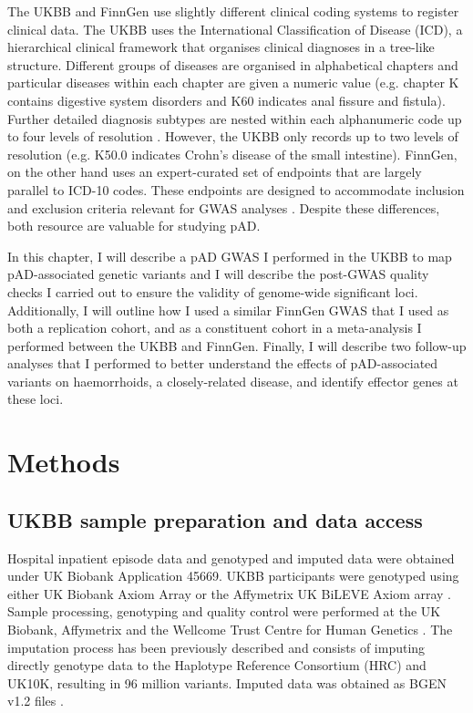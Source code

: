 The UKBB and FinnGen use slightly different clinical coding systems to register clinical data. The UKBB uses the International Classification of Disease (ICD), a hierarchical clinical framework that organises clinical diagnoses in a tree-like structure. Different groups of diseases are organised in alphabetical chapters and particular diseases within each chapter are given a numeric value (e.g. chapter K contains digestive system disorders and K60 indicates anal fissure and fistula). Further detailed diagnosis subtypes are nested within each alphanumeric code up to four levels of resolution \cite{icd10_levels}. However, the UKBB only records up to two levels of resolution (e.g. K50.0 indicates Crohn's disease of the small intestine). FinnGen, on the other hand uses an expert-curated set of endpoints that are largely parallel to ICD-10 codes. These endpoints are designed to accommodate inclusion and exclusion criteria relevant for GWAS analyses \cite{finngen_endpoints}. Despite these differences, both resource are valuable for studying pAD. 

In this chapter, I will describe a pAD GWAS I performed in the UKBB to map pAD-associated genetic variants and I will describe the post-GWAS quality checks I carried out to ensure the validity of genome-wide significant loci. Additionally, I will outline how I used a similar FinnGen GWAS that I used as both a replication cohort, and as a constituent cohort in a meta-analysis I performed between the UKBB and FinnGen. Finally, I will describe two follow-up analyses that I performed to better understand the effects of pAD-associated variants on haemorrhoids, a closely-related disease, and identify effector genes at these loci.

\section{Methods}
\subsection{UKBB sample preparation and data access}
Hospital inpatient episode data and genotyped and imputed data were obtained under UK Biobank Application 45669. UKBB participants were genotyped using either UK Biobank Axiom Array \cite{ukbbaxiom_array} or the Affymetrix UK
BiLEVE Axiom array \cite{ukbbbelieve_array}. Sample processing, genotyping and quality control were performed at the UK Biobank, Affymetrix and the Wellcome Trust Centre for Human Genetics \cite{ukbb_sample_processing}. The imputation process has been previously described \cite{Bycroft2018-fj} and consists of imputing directly genotype data to the Haplotype Reference Consortium (HRC) and UK10K, resulting in 96 million variants. Imputed data was obtained as BGEN v1.2 files \cite{Band2018-tv}. 

